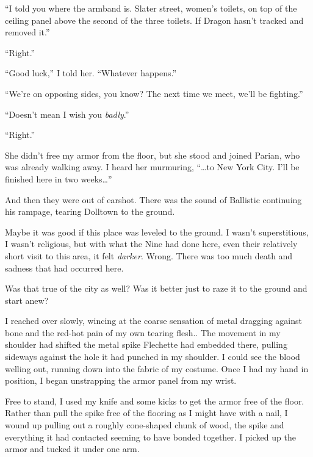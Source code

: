 ``I told you where the armband is.  Slater street, women's toilets, on top of the ceiling panel above the second of the three toilets.  If Dragon hasn't tracked and removed it.''



``Right.''



``Good luck,'' I told her.  ``Whatever happens.''



``We're on opposing sides, you know?  The next time we meet, we'll be fighting.''



``Doesn't mean I wish you \emph{badly}.''



``Right.''



She didn't free my armor from the floor, but she stood and joined Parian, who was already walking away.  I heard her murmuring, ``\ldots{}to New York City.  I'll be finished here in two weeks\ldots''



And then they were out of earshot.  There was the sound of Ballistic continuing his rampage, tearing Dolltown to the ground.



Maybe it was good if this place was leveled to the ground.  I wasn't superstitious, I wasn't religious, but with what the Nine had done here, even their relatively short visit to this area, it felt \emph{darker}.  Wrong.  There was too much death and sadness that had occurred here.



Was that true of the city as well?  Was it better just to raze it to the ground and start anew?



I reached over slowly, wincing at the coarse sensation of metal dragging against bone and the red-hot pain of my own tearing flesh..  The movement in my shoulder had shifted the metal spike Flechette had embedded there, pulling sideways against the hole it had punched in my shoulder. I could see the blood welling out, running down into the fabric of my costume.  Once I had my hand in position, I began unstrapping the armor panel from my wrist.



Free to stand, I used my knife and some kicks to get the armor free of the floor.  Rather than pull the spike free of the flooring as I might have with a nail, I wound up pulling out a roughly cone-shaped chunk of wood, the spike and everything it had contacted seeming to have bonded together.  I picked up the armor and tucked it under one arm.



